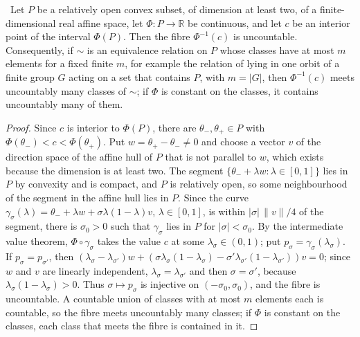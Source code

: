 \begin{theorem}\label{thm:continuum}
\stA\ Let $P$ be a relatively open convex subset, of dimension at least two, of a finite-dimensional real affine space, let $\Phi:P\to\mathbb R$ be continuous, and let $c$ be an interior point of the interval $\Phi(P)$. Then the fibre $\Phi^{-1}(c)$ is uncountable. Consequently, if $\sim$ is an equivalence relation on $P$ whose classes have at most $m$ elements for a fixed finite $m$, for example the relation of lying in one orbit of a finite group $G$ acting on a set that contains $P$, with $m=|G|$, then $\Phi^{-1}(c)$ meets uncountably many classes of $\sim$; if $\Phi$ is constant on the classes, it contains uncountably many of them.
\end{theorem}
\begin{proof}
Since $c$ is interior to $\Phi(P)$, there are $\theta_-,\theta_+\in P$ with $\Phi(\theta_-)<c<\Phi(\theta_+)$. Put $w=\theta_+-\theta_-\ne0$ and choose a vector $v$ of the direction space of the affine hull of $P$ that is not parallel to $w$, which exists because the dimension is at least two. The segment $\{\theta_-+\lambda w:\lambda\in[0,1]\}$ lies in $P$ by convexity and is compact, and $P$ is relatively open, so some neighbourhood of the segment in the affine hull lies in $P$. Since the curve $\gamma_\sigma(\lambda)=\theta_-+\lambda w+\sigma\lambda(1-\lambda)v$, $\lambda\in[0,1]$, is within $|\sigma|\,\lVert v\rVert/4$ of the segment, there is $\sigma_0>0$ such that $\gamma_\sigma$ lies in $P$ for $|\sigma|<\sigma_0$. By the intermediate value theorem, $\Phi\circ\gamma_\sigma$ takes the value $c$ at some $\lambda_\sigma\in(0,1)$; put $p_\sigma=\gamma_\sigma(\lambda_\sigma)$. If $p_\sigma=p_{\sigma'}$, then $(\lambda_\sigma-\lambda_{\sigma'})w+(\sigma\lambda_\sigma(1-\lambda_\sigma)-\sigma'\lambda_{\sigma'}(1-\lambda_{\sigma'}))v=0$; since $w$ and $v$ are linearly independent, $\lambda_\sigma=\lambda_{\sigma'}$ and then $\sigma=\sigma'$, because $\lambda_\sigma(1-\lambda_\sigma)>0$. Thus $\sigma\mapsto p_\sigma$ is injective on $(-\sigma_0,\sigma_0)$, and the fibre is uncountable. A countable union of classes with at most $m$ elements each is countable, so the fibre meets uncountably many classes; if $\Phi$ is constant on the classes, each class that meets the fibre is contained in it.
\end{proof}

